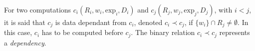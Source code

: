 \begin{mydef}
For two computations $c_i(R_i,w_i,\text{exp}_i,D_i)$ and $c_j(R_j,w_j,\text{exp}_j,D_j)$, with $i < j$, it is said that $c_j$ is data dependant from $c_i$, denoted $c_i\prec c_j$, if $\{w_i\} \cap R_j \neq \emptyset$. In this case, $c_i$ has to be computed before $c_j$. The binary relation $c_i\prec c_j$ represents a \textit{dependency}.
\end{mydef}








